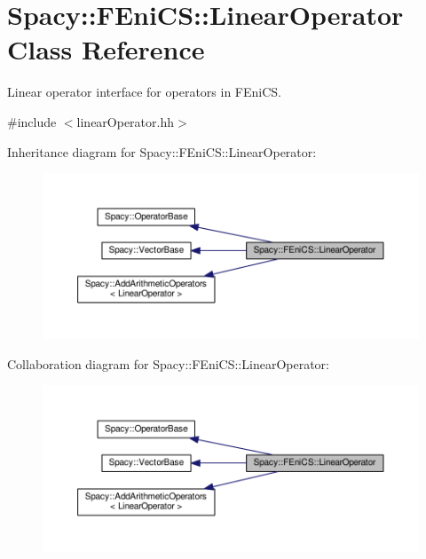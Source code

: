 \hypertarget{classSpacy_1_1FEniCS_1_1LinearOperator}{}\section{Spacy\+:\+:F\+Eni\+CS\+:\+:Linear\+Operator Class Reference}
\label{classSpacy_1_1FEniCS_1_1LinearOperator}


Linear operator interface for operators in F\+Eni\+CS.  




{\ttfamily \#include $<$linear\+Operator.\+hh$>$}



Inheritance diagram for Spacy\+:\+:F\+Eni\+CS\+:\+:Linear\+Operator\+:
\nopagebreak
\begin{figure}[H]
\begin{center}
\leavevmode
\includegraphics[width=350pt]{classSpacy_1_1FEniCS_1_1LinearOperator__inherit__graph}
\end{center}
\end{figure}


Collaboration diagram for Spacy\+:\+:F\+Eni\+CS\+:\+:Linear\+Operator\+:
\nopagebreak
\begin{figure}[H]
\begin{center}
\leavevmode
\includegraphics[width=350pt]{classSpacy_1_1FEniCS_1_1LinearOperator__coll__graph}
\end{center}
\end{figure}
